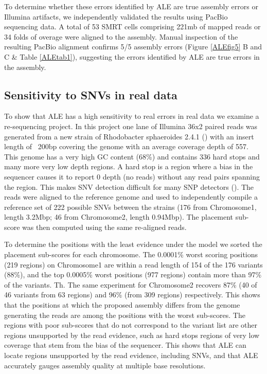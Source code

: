 \documentclass[phd,tocprelim]{cornell}
\begin{document}
To determine whether these errors identified by ALE are true assembly errors or Illumina artifacts, we independently validated the results using PacBio sequencing data. A total of 53 SMRT cells comprising 221mb of mapped reads or 34 folds of overage were aligned to the assembly. Manual inspection of the resulting PacBio alignment confirms 5/5 assembly errors (Figure \ref{ALEfig5} B and C \& Table \ref{ALEtab1}), suggesting the errors identified by ALE are true errors in the assembly. 

\subsection{Sensitivity to SNVs in real data}
To show that ALE has a high sensitivity to real errors in real data we examine a re-sequencing project. In this project one lane of Illumina 36x2 paired reads was generated from a new strain of Rhodobacter sphaeroides 2.4.1 (\cite{Choudhary2006}) with an insert length of ~200bp covering the genome with an average coverage depth of 557. This genome has a very high GC content (68\%) and contains 336 hard stops and many more very low depth regions. A hard stop is a region where a bias in the sequencer causes it to report 0 depth (no reads) without any read pairs spanning the region. This makes SNV detection difficult for many SNP detectors (\cite{Wang2011}). The reads were aligned to the reference genome and used to independently compile a reference set of 222 possible SNVs between the strains (176 from Chromosome1, length 3.2Mbp; 46 from Chromosome2, length 0.94Mbp). The placement sub-score was then computed using the same re-aligned reads.

To determine the positions with the least evidence under the model we sorted the placement sub-scores for each chromosome. The 0.0001\% worst scoring positions (219 regions) on Chromosome1 are within a read length of 154 of the 176 variants (88\%), and the top 0.0005\% worst positions (977 regions) contain more than 97\% of the variants. Th. The same experiment for Chromosome2 recovers 87\% (40 of 46 variants from 63 regions) and 96\% (from 309 regions) respectively. This shows that the positions at which the proposed assembly differs from the genome generating the reads are among the positions with the worst sub-scores.  The regions with poor sub-scores that do not correspond to the variant list are other regions unsupported by the read evidence, such as hard stops regions of very low coverage that stem from the bias of the sequencer. This shows that ALE can locate regions unsupported by the read evidence, including SNVs, and that ALE accurately gauges assembly quality at multiple base resolutions.
\end{document}

